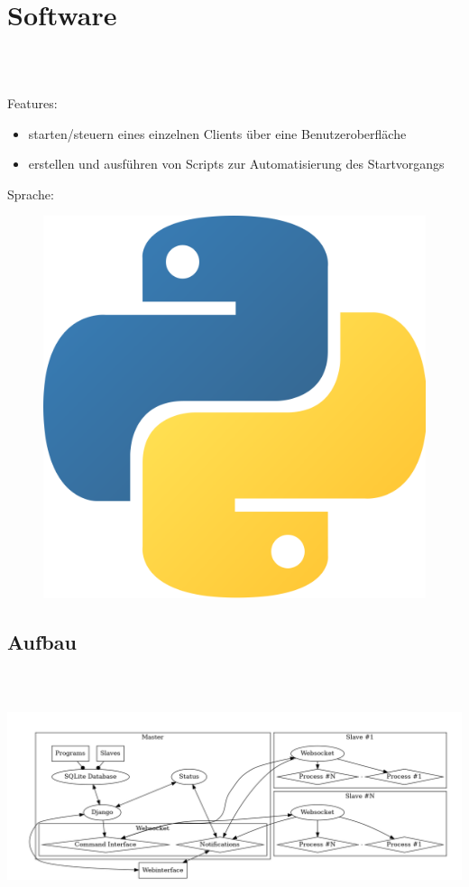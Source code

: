 \documentclass[accentcolor=tud1b,colorbacktitle,landscape,german,presentation]{tudbeamer}
\newcommand{\ftitle}{

	\frametitle{\insertsectionhead \\ {\small \insertsubsectionhead}}
}
\begin{document}
\section{Software}
\subsection{}
\begin{frame}
	\ftitle
	Features:
	\begin{itemize}
		\item starten/steuern eines einzelnen Clients über eine Benutzeroberfläche
		\item erstellen und ausführen von Scripts zur Automatisierung des Startvorgangs
	\end{itemize}
	\vspace{0.5cm}
	Sprache:
	\begin{figure}
		\centering
		\includegraphics[scale=0.05]{python}
	\end{figure}
\end{frame}

\subsection{Aufbau}
\begin{frame}
	\ftitle
	\includegraphics[scale=0.25]{architecture}
\end{frame}
\end{document}
